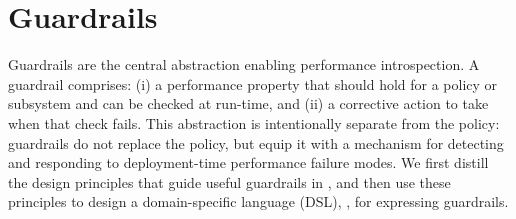\section{Guardrails}\label{sec:guardrails}

Guardrails are the central abstraction enabling performance introspection. 
A guardrail comprises: (i) a performance property that should hold for a policy or subsystem and can be checked at run-time, and (ii) a corrective action to take when that check fails.
This abstraction is intentionally separate from the policy: guardrails do not replace the policy, but equip it with a mechanism for detecting and responding to deployment-time performance failure modes.
We first distill the design principles that guide useful guardrails in , and then use these principles to design a domain-specific language (DSL), \lang, for expressing guardrails.



